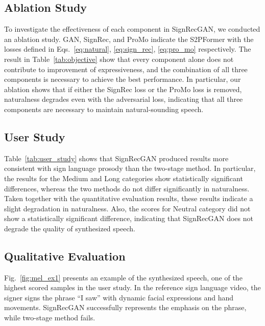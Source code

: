 \subsection{Ablation Study}
To investigate the effectiveness of each component in SignRecGAN, we conducted an ablation study.
GAN, SignRec, and ProMo indicate the S2PFormer with the losses defined in Eqs.~\ref{eq:natural}, \ref{eq:sign_rec}, \ref{eq:pro_mo} respectively.
The result in Table~\ref{tab:objective} show that every component alone does not contribute to improvement of expressiveness, and the combination of all three components is necessary to achieve the best performance. 
In particular, our ablation shows that 
if either the SignRec loss or the ProMo loss is removed, 
naturalness degrades even with the adversarial loss, 
indicating that all three components are necessary to maintain natural-sounding speech.



\subsection{User Study}
Table~\ref{tab:user_study} shows that SignRecGAN produced results more consistent with sign language prosody than the two-stage method. In particular, the results for the Medium and Long categories show statistically significant differences, whereas the two methods do not differ significantly in naturalness.
Taken together with the quantitative evaluation results, these results indicate a slight degradation in naturalness.
Also, the scores for Neutral category did not show a statistically significant difference, indicating that SignRecGAN does not degrade the quality of synthesized speech.



\subsection{Qualitative Evaluation}
\label{sec:qualitative}
Fig.~\ref{fig:mel_ex1} presents an example of the synthesized speech, one of the highest scored samples in the user study. In the reference sign language video, the signer signs the phrase ``I saw'' with dynamic facial expressions and hand movements. SignRecGAN successfully represents the emphasis on the phrase, while two-stage method fails.

